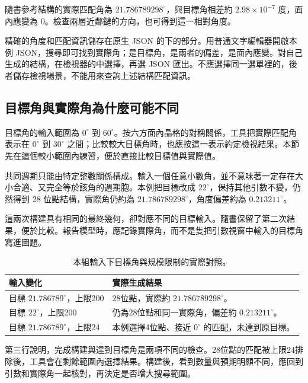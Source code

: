 隨書參考結構的實際匹配角為 $21.786789298^\circ$，與目標角相差約 $2.98\times10^{-7}$ 度，面內應變為 0。檢查兩層近鄰鍵的方向，也可得到這一相對角度。

精確的角度和匹配資訊儲存在原生 JSON 的下的部分。用普通文字編輯器開啟本例 JSON，搜尋即可找到實際角；是目標角，是兩者的偏差，是面內應變。對自己生成的結構，在檢視器的中選擇，再選 JSON 匯出。不應選擇同一選單裡的，後者儲存檢視場景，不能用來查詢上述結構匹配資訊。

\subsection{目標角與實際角為什麼可能不同}

目標角的輸入範圍為 $0^\circ$ 到 $60^\circ$。按六方面內晶格的對稱關係，工具把實際匹配角表示在 $0^\circ$ 到 $30^\circ$ 之間；比較較大目標角時，也應按這一表示約定檢視結果。本節先在這個較小範圍內練習，便於直接比較目標值與實際值。

共同週期只能由特定整數關係構成。輸入一個任意小數角，並不意味著一定存在大小合適、又完全等於該角的週期胞。本例把目標改成 $22^\circ$，保持其他引數不變，仍然得到 28 位點結構，實際角仍約為 $21.786789298^\circ$，角度偏差約為 $0.213211^\circ$。

這兩次構建具有相同的最終幾何，卻對應不同的目標輸入。隨書保留了第二次結果，便於比較。報告模型時，應記錄實際角，而不是隻把引數視窗中輸入的目標角寫進圖題。

\begin{table}[htbp]
\centering
\caption{本組輸入下目標角與規模限制的實際對照。}
\begin{tabularx}{\linewidth}{lX}
\toprule
輸入變化 & 實際生成結果\\
\midrule
目標 $21.786789^\circ$，上限200 & 28位點，實際約 $21.786789298^\circ$。\\
目標 $22^\circ$，上限200 & 仍為28位點和同一實際角，偏差約 $0.213211^\circ$。\\
目標 $21.786789^\circ$，上限24 & 本例選擇4位點、接近 $0^\circ$ 的匹配，未達到原目標。\\
\bottomrule
\end{tabularx}
\end{table}

第三行說明，完成構建與達到目標角是兩項不同的檢查。28位點的匹配被上限24排除後，工具會在剩餘範圍內選擇結果。構建後，看到數量與預期明顯不同，應回到引數和實際角一起核對，再決定是否增大搜尋範圍。


